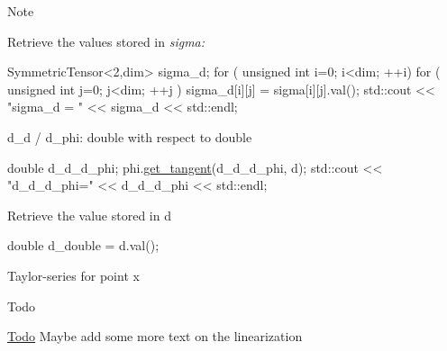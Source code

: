 \begin{DoxyNote}{Note}
\begin{DoxyCode}
\end{DoxyCode}
 Retrieve the values stored in {\itshape sigma\+:} 
\begin{DoxyCode}
SymmetricTensor<2,dim> sigma\_d;
\textcolor{keywordflow}{for} ( \textcolor{keywordtype}{unsigned} \textcolor{keywordtype}{int} i=0; i<dim; ++i)
      \textcolor{keywordflow}{for} ( \textcolor{keywordtype}{unsigned} \textcolor{keywordtype}{int} j=0; j<dim; ++j )
          sigma\_d[i][j] = sigma[i][j].val();
std::cout << \textcolor{stringliteral}{"sigma\_d = "} << sigma\_d << std::endl;
\end{DoxyCode}
 d\+\_\+d / d\+\_\+phi\+: double with respect to double 
\begin{DoxyCode}
\textcolor{keywordtype}{double} d\_d\_d\_phi;
phi.\hyperlink{classSacado__Wrapper_1_1SW__double_a2e6eca4457eb22b06172bb5749038f1e}{get\_tangent}(d\_d\_d\_phi, d);
std::cout << \textcolor{stringliteral}{"d\_d\_d\_phi="} << d\_d\_d\_phi << std::endl;
\end{DoxyCode}
 Retrieve the value stored in d 
\begin{DoxyCode}
\textcolor{keywordtype}{double} d\_double = d.val();
\end{DoxyCode}
 Taylor-\/series for point x 
\end{DoxyNote}
\begin{DoxyRefDesc}{Todo}
\item[\hyperlink{todo__todo000006}{Todo}]Maybe add some more text on the linearization \end{DoxyRefDesc}

